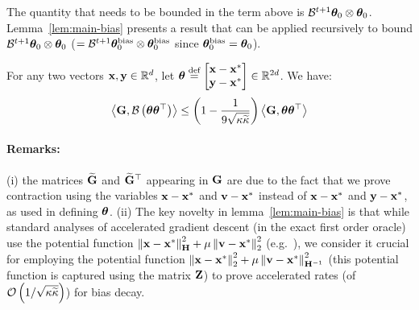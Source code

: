 \vspace{-0.2cm}The quantity that needs to be bounded in the term above is $\mathcal{B}^{t+1}\boldsymbol{\theta}_0\otimes\boldsymbol{\theta}_0$. Lemma~\ref{lem:main-bias} presents a result that can be applied recursively to bound $\mathcal{B}^{t+1}\boldsymbol{\theta}_0\otimes\boldsymbol{\theta}_0$ ($=\mathcal{B}^{t+1}\boldsymbol{\theta}_0^{\textrm{bias}}\otimes\boldsymbol{\theta}_0^{\textrm{bias}}$ since $\boldsymbol{\theta}_0^{\textrm{bias}}=\boldsymbol{\theta}_0$).
\begin{lemma} \label{lem:main-bias}
	For any two vectors $\mathbf{x}, \mathbf{y} \in \mathbb{R}^d$, let $\boldsymbol{\theta} \stackrel{\textrm{def}}{=} \begin{bmatrix}
	\mathbf{x}-\mathbf{x}^* \\ \mathbf{y}-\mathbf{x}^*
	\end{bmatrix} \in \mathbb{R}^{2d}$. We have: \vspace*{-2mm}
	\begin{align*}
	\iprod{\G}{\B \left(\thetav \thetav \T\right)} \leq \bigg(1-\frac{1}{9\sqrt{\cnH\cnS}}\bigg) \iprod{\G}{\thetav \thetav \T}%
	\end{align*}
\end{lemma}

\vspace{-0.4cm}
\paragraph{Remarks:}(i) the matrices $\widetilde{\mathbf{G}}$ and $\widetilde{\mathbf{G}}^{\top}$ appearing in $\mathbf{G}$ are due to the fact that we prove contraction using the variables $\mathbf{x}-\mathbf{x}^*$ and $\mathbf{v}-\mathbf{x}^*$ \iffalse(see Algorithm~\ref{algo:TAASGD})\fi instead of $\mathbf{x}-\mathbf{x}^*$ and $\mathbf{y}-\mathbf{x}^*$, as used in defining $\boldsymbol{\theta}$. (ii) The key novelty in lemma~\ref{lem:main-bias} is that while standard analyses of accelerated gradient descent (in the exact first order oracle) use the potential function $\left\| \mathbf{x}-\mathbf{x}^* \right\|_{\mathbf{H}}^2 + \mu \left\| \mathbf{v} - \mathbf{x}^* \right\|_2^2$ (e.g.~\cite{WilsonRJ16}), we consider it crucial for employing the potential function $\left\| \mathbf{x}-\mathbf{x}^* \right\|_2^2 + \mu \left\| \mathbf{v} - \mathbf{x}^* \right\|_{{\mathbf{H}}^{-1}}^2$ (this potential function is captured using the matrix $\mathbf{Z}$\iffalse$\begin{bmatrix} \Id &\zero \\ \zero & \mu\inv{\Cov} \end{bmatrix}$\fi) to prove accelerated rates (of $\mathcal{O}\left(1/\sqrt{{\kappa}\widetilde{\kappa}}\right)$) for bias decay. 

